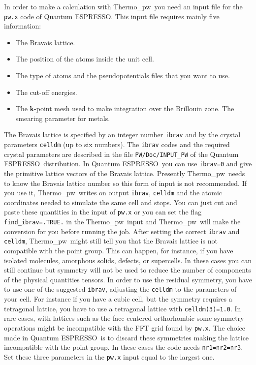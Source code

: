 \documentclass[12pt,a4paper,twoside]{report}
\def\qe{{\sc Quantum ESPRESSO}}
\def\thermo{{\sc Thermo}\_{\sc pw}}
\begin{document}
In order to make a calculation with \thermo\ you need  
an input file for the \texttt{pw.x} code of \qe. This input file
requires mainly five information:
\begin{itemize}
\item The Bravais lattice.

\item The position of the atoms inside the unit cell.

\item The type of atoms and the pseudopotentials files that you want to use.

\item The cut-off energies.

\item The {\bf k}-point mesh used to make integration over
the Brillouin zone. The smearing parameter for metals. 
\end{itemize}

The Bravais lattice is specified by an integer number \texttt{ibrav} and by the
crystal parameters \texttt{celldm} (up to six numbers).  
The \texttt{ibrav} codes and the required crystal parameters 
are described in the file \texttt{PW/Doc/INPUT\_PW} of the 
\qe\ distribution. 
In \qe\ you can use \texttt{ibrav=0} and give the primitive
lattice vectors of the Bravais lattice. Presently \thermo\ needs to
know the Bravais lattice number so this form of input is not recommended. 
If you use it, \thermo\ writes on output \texttt{ibrav}, 
\texttt{celldm} and the atomic coordinates needed to simulate
the same cell and stops.
You can just cut and paste these quantities in the input of \texttt{pw.x}
or you can set the flag \texttt{find\_ibrav=.TRUE.} in the \thermo\ input
and \thermo\ will make the conversion for you before running the job. 
After setting the correct
\texttt{ibrav} and \texttt{celldm}, \thermo\ might still tell you
that the Bravais lattice is not compatible with the point group. This
can happen, for instance, if you have isolated molecules, amorphous solids,
defects, or supercells. In these cases you can still continue but symmetry 
will not be 
used to reduce the number of components of the physical quantities tensors. 
In order to use the residual symmetry, you have to
use one of the suggested \texttt{ibrav}, adjusting the \texttt{celldm} to
the parameters of your cell. For instance if you have a cubic cell, but
the symmetry requires a tetragonal lattice, you have to use a tetragonal
lattice with \texttt{celldm(3)=1.0}.
In rare cases, with lattices such as the face-centered orthorhombic some
symmetry operations might be incompatible with the FFT grid found by 
\texttt{pw.x}. The choice made in \qe\ is to discard these symmetries making
the lattice incompatible with the point group. In these cases the code needs 
\texttt{nr1=nr2=nr3}. Set these three parameters in the \texttt{pw.x} input 
equal to the largest one. 
\end{document}
